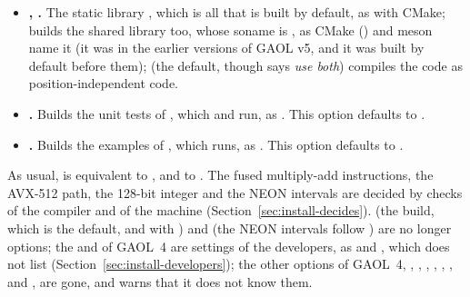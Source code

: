 \begin{itemize}
  .\newinvfive
\item[$\bullet$] \textbf{,
  .} The static library
  , which is all that is built by default, as with CMake;
   builds the shared library 
  too, whose soname is , as CMake
  () and meson name it (it was
   in the earlier versions of GAOL v5, and it was built
  by default before them);  (the default, though
   says \emph{use both}) compiles the code as
  position-independent code.\newinvfive
\item[$\bullet$] \textbf{.} Builds the unit
  tests of , which  and  run, as
  . This option defaults to .
\item[$\bullet$] \textbf{.} Builds the
  examples of , which  runs, as
  . This option defaults to .
\end{itemize}

\noindent
{\raggedright %
As usual,  is equivalent to
, and  to
. The fused multiply-add instructions, the
AVX-512 path, the 128-bit integer and the NEON intervals are decided by checks
of the compiler and of the machine (Section~\ref{sec:install-decides}).
 (the  build, which is the default,
and  with ) and 
(the NEON intervals follow ) are no longer options; the
 and  of GAOL~4 are
settings of the developers, as  and
, which  does not list
(Section~\ref{sec:install-developers}); the other options of GAOL~4,
, ,
, ,
, , 
and , are gone, and  warns that it
does not know them.\newinvfive{}\par}

